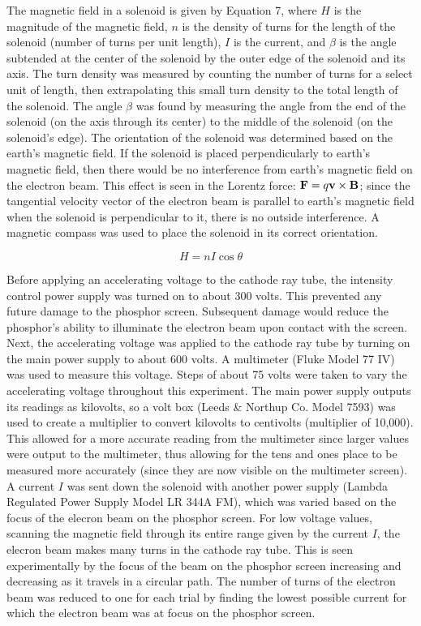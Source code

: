 \documentclass[%
 aip,
 amsmath,amssymb,
 reprint,%
floatfix,
]{revtex4-1}
\begin{document}
The magnetic field in a solenoid is given by Equation 7, where $H$ is the magnitude of the magnetic field, $n$ is the density of turns for the length of the solenoid (number of turns per unit length), $I$ is the current, and $\beta$ is the angle subtended at the center of the solenoid by the outer edge of the solenoid and its axis\cite{oxymanual}. The turn density was measured by counting the number of turns for a select unit of length, then extrapolating this small turn density to the total length of the solenoid. The angle $\beta$ was found by measuring the angle from the end of the solenoid (on the axis through its center) to the middle of the solenoid (on the solenoid's edge). The orientation of the solenoid was determined based on the earth's magnetic field. If the solenoid is placed perpendicularly to earth's magnetic field, then there would be no interference from earth's magnetic field on the electron beam. This effect is seen in the Lorentz force: $\bold{F} = q\bold{v} \times \bold{B}$; since the tangential velocity vector of the electron beam is parallel to earth's magnetic field when the solenoid is perpendicular to it, there is no outside interference. A magnetic compass was used to place the solenoid in its correct orientation.

\begin{equation}
	H = nI\cos{\theta}
\end{equation}

Before applying an accelerating voltage to the cathode ray tube, the intensity control power supply was turned on to about 300 volts. This prevented any future damage to the phosphor screen. Subsequent damage would reduce the phosphor's ability to illuminate the electron beam upon contact with the screen. Next, the accelerating voltage was applied to the cathode ray tube by turning on the main power supply to about 600 volts. A multimeter (Fluke Model 77 IV) was used to measure this voltage. Steps of about 75 volts were taken to vary the accelerating voltage throughout this experiment. The main power supply outputs its readings as kilovolts, so a volt box (Leeds \& Northup Co. Model 7593) was used to create a multiplier to convert kilovolts to centivolts (multiplier of 10,000). This allowed for a more accurate reading from the multimeter since larger values were output to the multimeter, thus allowing for the tens and ones place to be measured more accurately (since they are now visible on the multimeter screen). A current $I$ was sent down the solenoid with another power supply (Lambda Regulated Power Supply Model LR 344A FM), which was varied based on the focus of the elecron beam on the phosphor screen. For low voltage values, scanning the magnetic field through its entire range given by the current $I$, the elecron beam makes many turns in the cathode ray tube. This is seen experimentally by the focus of the beam on the phosphor screen increasing and decreasing as it travels in a circular path. The number of turns of the electron beam was reduced to one for each trial by finding the lowest possible current for which the electron beam was at focus on the phosphor screen.
\end{document}

